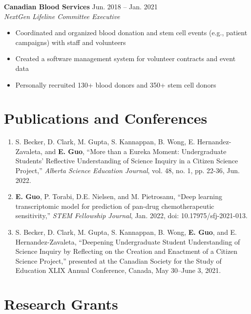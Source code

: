 \documentclass{article}
\begin{document}
\textbf{Canadian Blood Services} \hfill Jun. 2018 -- Jan. 2021 \\
\textit{NextGen Lifeline Committee Executive}
\begin{itemize}
    \item Coordinated and organized blood donation and stem cell events (e.g., patient campaigns) with staff and volunteers
    \item Created a software management system for volunteer contracts and event data
    \item Personally recruited 130+ blood donors and 350+ stem cell donors
\end{itemize}


\section*{\textcolor{my_colour}{Publications and Conferences}}
\vspace{-.25em} \hrulefill \vspace{.25em}

\begin{enumerate}[itemsep=1em]
    \item S. Becker, D. Clark, M. Gupta, S. Kannappan, B. Wong, E. Hernandez-Zavaleta, and \textbf{E. Guo}, ``More than a Eureka Moment: Undergraduate Students' Reflective Understanding of Science Inquiry in a Citizen Science Project,'' \textit{Alberta Science Education Journal}, vol. 48, no. 1, pp. 22-36, Jun. 2022.
    \item \textbf{E. Guo}, P. Torabi, D.E. Nielsen, and M. Pietrosanu, ``Deep learning transcriptomic model for prediction of pan-drug chemotherapeutic sensitivity,'' \textit{STEM Fellowship Journal}, Jan. 2022, doi: 10.17975/sfj-2021-013.
    \item S. Becker, D. Clark, M. Gupta, S. Kannappan, B. Wong, \textbf{E. Guo}, and E. Hernandez-Zavaleta, ``Deepening Undergraduate Student Understanding of Science Inquiry by Reflecting on the Creation and Enactment of a Citizen Science Project,'' presented at the Canadian Society for the Study of Education XLIX Annual Conference, Canada, May 30--June 3, 2021.
\end{enumerate}


\section*{\textcolor{my_colour}{Research Grants}}
\vspace{-.25em} \hrulefill \vspace{.25em}
\end{document}
